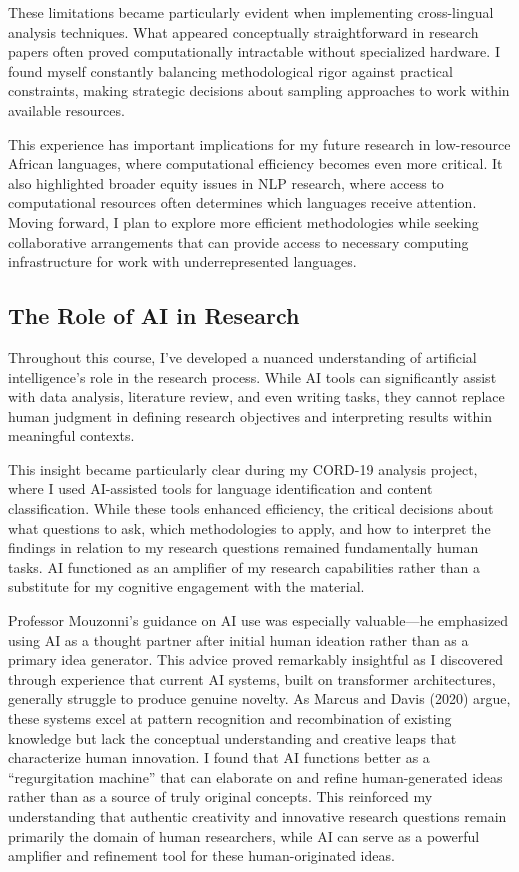 \documentclass[
]{article}
\begin{document}
These limitations became particularly evident when implementing
cross-lingual analysis techniques. What appeared conceptually
straightforward in research papers often proved computationally
intractable without specialized hardware. I found myself constantly
balancing methodological rigor against practical constraints, making
strategic decisions about sampling approaches to work within available
resources.

This experience has important implications for my future research in
low-resource African languages, where computational efficiency becomes
even more critical. It also highlighted broader equity issues in NLP
research, where access to computational resources often determines which
languages receive attention. Moving forward, I plan to explore more
efficient methodologies while seeking collaborative arrangements that
can provide access to necessary computing infrastructure for work with
underrepresented languages.

\subsection{The Role of AI in
Research}\label{the-role-of-ai-in-research}

Throughout this course, I've developed a nuanced understanding of
artificial intelligence's role in the research process. While AI tools
can significantly assist with data analysis, literature review, and even
writing tasks, they cannot replace human judgment in defining research
objectives and interpreting results within meaningful contexts.

This insight became particularly clear during my CORD-19 analysis
project, where I used AI-assisted tools for language identification and
content classification. While these tools enhanced efficiency, the
critical decisions about what questions to ask, which methodologies to
apply, and how to interpret the findings in relation to my research
questions remained fundamentally human tasks. AI functioned as an
amplifier of my research capabilities rather than a substitute for my
cognitive engagement with the material.

Professor Mouzonni's guidance on AI use was especially valuable---he
emphasized using AI as a thought partner after initial human ideation
rather than as a primary idea generator. This advice proved remarkably
insightful as I discovered through experience that current AI systems,
built on transformer architectures, generally struggle to produce
genuine novelty. As Marcus and Davis (2020) argue, these systems excel
at pattern recognition and recombination of existing knowledge but lack
the conceptual understanding and creative leaps that characterize human
innovation. I found that AI functions better as a ``regurgitation
machine'' that can elaborate on and refine human-generated ideas rather
than as a source of truly original concepts. This reinforced my
understanding that authentic creativity and innovative research
questions remain primarily the domain of human researchers, while AI can
serve as a powerful amplifier and refinement tool for these
human-originated ideas.
\end{document}
